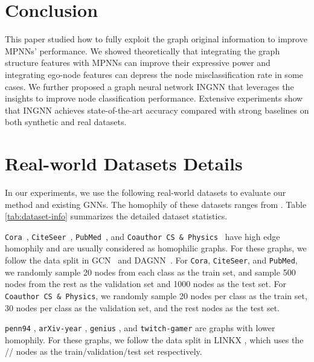 \documentclass{article}
\theoremstyle{plain}
\newcommand{\pjn}{{INGNN}}
\begin{document}
\section{Conclusion}\label{sect:conclusion}
This paper studied how to fully exploit the graph original information to improve MPNNs' performance. 
We showed theoretically that integrating the graph structure features with MPNNs can improve their expressive power and integrating ego-node features can depress the node misclassification rate in some cases.
We further proposed a graph neural network \pjn{} that leverages the insights to improve node classification performance.
Extensive experiments show that \pjn{} achieves state-of-the-art accuracy compared with strong baselines on both synthetic and real datasets. 



\small







\newpage
\appendix
\onecolumn
\section{Real-world Datasets Details}\label{sect:app-dataset-details}

In our experiments, we use the following real-world datasets to evaluate our method and existing GNNs. The homophily of these datasets ranges from . Table \ref{tab:dataset-info} summarizes the detailed dataset statistics. 

\texttt{Cora}~\cite{sen2008collective}, \texttt{CiteSeer}~\cite{sen2008collective}, \texttt{PubMed}~\cite{sen2008collective}, and \texttt{Coauthor CS \& Physics}~\cite{shchur2018pitfalls} have high edge homophily and are usually considered as homophilic graphs. For these graphs, we follow the data split in GCN~\cite{kipf2016semi} and DAGNN~\cite{liu2020towards}. For \texttt{Cora}, \texttt{CiteSeer}, and \texttt{PubMed}, we randomly sample 20 nodes from each class as the train set, and sample 500 nodes from the rest as the validation set and 1000 nodes as the test set. For \texttt{Coauthor CS \& Physics}, we randomly sample 20 nodes per class as the train set, 30 nodes per class as the validation set, and the rest nodes as the test set.

\texttt{penn94} \cite{traud2012social}, \texttt{arXiv-year} \cite{hu2020open}, \texttt{genius} \cite{lim2021expertise}, and \texttt{twitch-gamer} \cite{rozemberczki2021twitch} are graphs with lower homophily. For these graphs, we follow the data split in LINKX \cite{lim2021new,lim2021large}, which uses the // nodes as the train/validation/test set respectively.
\end{document}
